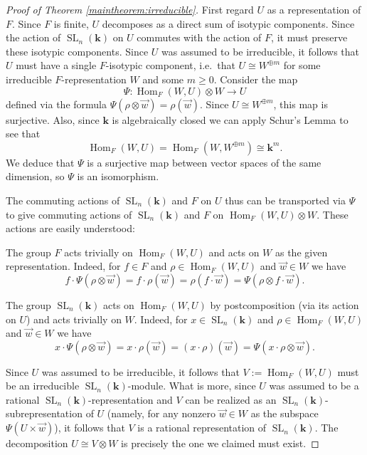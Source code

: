 \documentclass[11pt]{article}
\numberwithin{equation}{section}
\theoremstyle{plain}
\theoremstyle{definition}
\theoremstyle{remark}
\DeclareMathOperator{\Hom}{Hom}
\DeclareMathOperator{\SL}{SL}
\newcommand\bk{\ensuremath{\mathbf{k}}}
\begin{document}
\begin{proof}[Proof of Theorem \ref{maintheorem:irreducible}]
First regard $U$ as a representation of $F$.  Since $F$ is finite, $U$ decomposes as a direct sum
of isotypic components.  Since the action of $\SL_n(\bk)$ on $U$ commutes with the action of $F$, it
must preserve these isotypic components.  Since $U$ was assumed to be irreducible, it follows
that $U$ must have a single $F$-isotypic component, i.e.\ that $U \cong W^{\oplus m}$ for some
irreducible $F$-representation $W$ and some $m \geq 0$.  Consider the map
\[\Psi\colon \Hom_F(W,U) \otimes W \rightarrow U\]
defined via the formula $\Psi(\rho \otimes \vec{w}) = \rho(\vec{w})$.  Since $U \cong W^{\oplus m}$, this
map is surjective.  Also, since $\bk$ is algebraically closed we can apply Schur's Lemma to see
that 
\[\Hom_F(W,U) = \Hom_F(W,W^{\oplus m}) \cong \bk^m.\]
We deduce that $\Psi$ is a surjective map between vector spaces of the same dimension, so $\Psi$ is an isomorphism.

The commuting actions of $\SL_n(\bk)$ and $F$ on $U$ thus can be transported via $\Psi$ to give commuting
actions of $\SL_n(\bk)$ and $F$ on $\Hom_F(W,U) \otimes W$.  These actions are easily understood:
\begin{compactitem}
\item The group $F$ acts trivially on $\Hom_F(W,U)$ and acts on $W$ as the given representation.  Indeed, for
$f \in F$ and $\rho \in \Hom_F(W,U)$ and $\vec{w} \in W$ we have
\[f \cdot \Psi(\rho \otimes \vec{w}) = f \cdot \rho(\vec{w}) = \rho(f \cdot \vec{w}) = \Psi(\rho \otimes f \cdot \vec{w}).\]
\item The group $\SL_n(\bk)$ acts on $\Hom_F(W,U)$ by postcomposition (via its action on $U$) and acts trivially on
$W$.  Indeed, for $x \in \SL_n(\bk)$ and $\rho \in \Hom_F(W,U)$ and $\vec{w} \in W$ we have
\[x \cdot \Psi(\rho \otimes \vec{w}) = x \cdot \rho(\vec{w}) = (x \cdot \rho)(\vec{w}) = \Psi(x \cdot \rho \otimes \vec{w}).\]
\end{compactitem}
Since $U$ was assumed to be irreducible, it follows that $V:=\Hom_F(W,U)$ must be an irreducible
$\SL_n(\bk)$-module.  What is more, since $U$ was assumed to be a rational $\SL_n(\bk)$-representation and
$V$ can be realized as an $\SL_n(\bk)$-subrepresentation of $U$ (namely, for any nonzero $\vec{w} \in W$ as
the subspace $\Psi(U \times \vec{w})$), it follows that $V$ is a rational representation of
$\SL_n(\bk)$.  The decomposition $U \cong V \otimes W$ is precisely the one we claimed must exist.
\end{proof}

\appendix
\end{document}
